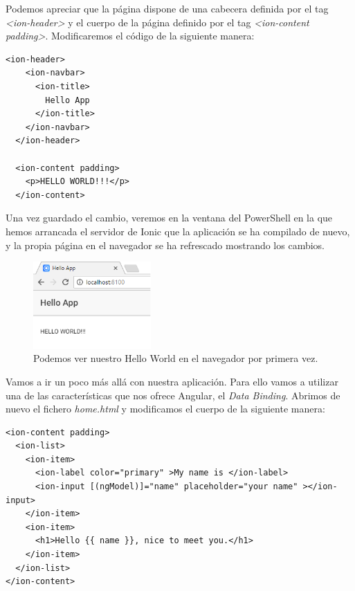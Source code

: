 
Podemos apreciar que la página dispone de una cabecera definida por el tag \emph{<ion-header>} y el cuerpo de la página definido por el tag \emph{<ion-content padding>}. Modificaremos el código de la siguiente manera:

\begin{lstlisting}[style=htmlcssjs,frame=tlrb,xleftmargin={0.2cm}]
  <ion-header>
    <ion-navbar>
      <ion-title>
        Hello App
      </ion-title>
    </ion-navbar>
  </ion-header>

  <ion-content padding>
    <p>HELLO WORLD!!!</p>
  </ion-content>
\end{lstlisting}

Una vez guardado el cambio, veremos en la ventana del PowerShell en la que hemos arrancada el servidor de Ionic que la aplicación se ha compilado de nuevo, y la propia página en el navegador se ha refrescado mostrando los cambios.

\begin{figure}[H]
\centering
  \includegraphics[width=0.4\textwidth,keepaspectratio]{Figures/ch2/HelloWorld/hello_world_1}
  \caption{Podemos ver nuestro Hello World en el navegador por primera vez.}
\end{figure}

Vamos a ir un poco más allá con nuestra aplicación. Para ello vamos a utilizar una de las características que nos ofrece Angular, el \emph{Data Binding}. Abrimos de nuevo el fichero \emph{home.html} y modificamos el cuerpo de la siguiente manera:

\begin{lstlisting}[style=htmlcssjs,frame=tlrb,xleftmargin={0.2cm}]
<ion-content padding>
  <ion-list>
    <ion-item>
      <ion-label color="primary" >My name is </ion-label>
      <ion-input [(ngModel)]="name" placeholder="your name" ></ion-input>
    </ion-item>
    <ion-item>
      <h1>Hello {{ name }}, nice to meet you.</h1>
    </ion-item>
  </ion-list>
</ion-content>
\end{lstlisting}

